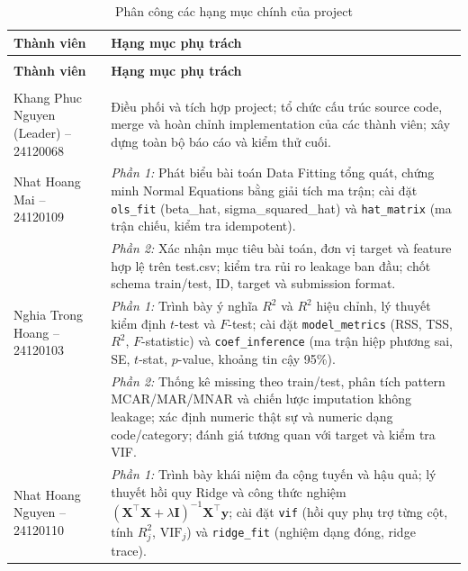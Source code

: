 \begin{longtable}{>{\raggedright\arraybackslash}p{}%
                  >{\raggedright\arraybackslash}p{}}
\caption{Phân công các hạng mục chính của project}
\label{tab:team_contributions} \\
\toprule
\textbf{Thành viên} & \textbf{Hạng mục phụ trách} \\
\midrule
\endfirsthead
\multicolumn{2}{r}{\small\textit{(tiếp theo)}} \\
\toprule
\textbf{Thành viên} & \textbf{Hạng mục phụ trách} \\
\midrule
\endhead
\midrule
\multicolumn{2}{r}{\small\textit{(xem trang tiếp)}} \\
\endfoot
\bottomrule
\endlastfoot
Khang Phuc Nguyen (Leader) -- 24120068
    & Điều phối và tích hợp project; tổ chức cấu trúc source code, merge và
      hoàn chỉnh implementation của các thành viên; xây dựng toàn bộ
      báo cáo và kiểm thử cuối. \\[4pt]
Nhat Hoang Mai -- 24120109
    & \textit{Phần 1:} Phát biểu bài toán Data Fitting tổng quát, chứng minh
      Normal Equations bằng giải tích ma trận; cài đặt \texttt{ols\_fit}
      (beta\_hat, sigma\_squared\_hat) và \texttt{hat\_matrix} (ma trận
      chiếu, kiểm tra idempotent). \\
    & \textit{Phần 2:} Xác nhận mục tiêu bài toán, đơn vị target và feature
      hợp lệ trên test.csv; kiểm tra rủi ro leakage ban đầu; chốt schema
      train/test, ID, target và submission format. \\[4pt]
Nghia Trong Hoang -- 24120103
    & \textit{Phần 1:} Trình bày ý nghĩa $R^2$ và $R^2$ hiệu chỉnh, lý thuyết
      kiểm định $t$-test và $F$-test; cài đặt \texttt{model\_metrics}
      (RSS, TSS, $R^2$, $F$-statistic) và \texttt{coef\_inference}
      (ma trận hiệp phương sai, SE, $t$-stat, $p$-value, khoảng tin cậy 95\%). \\
    & \textit{Phần 2:} Thống kê missing theo train/test, phân tích pattern
      MCAR/MAR/MNAR và chiến lược imputation không leakage; xác định
      numeric thật sự và numeric dạng code/category; đánh giá tương quan
      với target và kiểm tra VIF. \\[4pt]
Nhat Hoang Nguyen -- 24120110
    & \textit{Phần 1:} Trình bày khái niệm đa cộng tuyến và hậu quả; lý
      thuyết hồi quy Ridge và công thức nghiệm
      $(\mathbf{X}^\top\mathbf{X} + \lambda\mathbf{I})^{-1}\mathbf{X}^\top\mathbf{y}$;
      cài đặt \texttt{vif} (hồi quy phụ trợ từng cột, tính $R^2_j$,
      $\text{VIF}_j$) và \texttt{ridge\_fit} (nghiệm dạng đóng, ridge trace). \\

\end{longtable}
